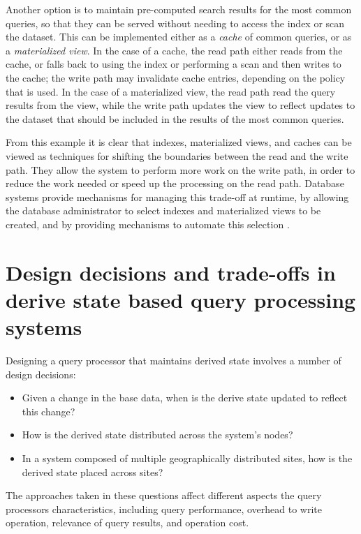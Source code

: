Another option is to maintain pre-computed search results for the most common queries, so that they can be served
without needing to access the index or scan the dataset.
This can be implemented either as a \textit{cache} of common queries, or as a \textit{materialized view}.
In the case of a cache, the read path either reads from the cache, or falls back to using the index or performing a scan
and then writes to the cache; the write path may invalidate cache entries, depending on the policy that is used.
In the case of a materialized view, the read path read the query results from the view, while the write path updates the
view to reflect updates to the dataset that should be included in the results of the most common queries.

From this example it is clear that indexes, materialized views, and caches can be viewed as techniques for shifting the
boundaries between the read and the write path.
They allow the system to perform more work on the write path, in order to reduce the work needed or speed up the
processing on the read path.
Database systems provide mechanisms for managing this trade-off at runtime, by allowing the database administrator
to select indexes and materialized views to be created, and by providing mechanisms to automate this selection
\cite{valentin:db2advisor, chaudhuri:decadeselftuning}.

\section{Design decisions and trade-offs in derive state based query processing systems}

Designing a query processor that maintains derived state involves a number of design decisions:
\begin{itemize}

  \item Given a change in the base data, when is the derive state updated to reflect this change?

  \item How is the derived state distributed across the system's nodes?

  \item In a system composed of multiple geographically distributed sites, how is the derived state placed across sites?

\end{itemize}

The approaches taken in these questions affect different aspects the query processors characteristics, including query
performance, overhead to write operation, relevance of query results, and operation cost.

